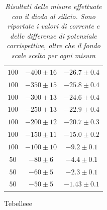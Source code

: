 \documentclass{article}
\begin{document}
\begin{table}[]
{\begin{tabular}{|c|c|c|}
$100$ & $-400\pm{16}$ & $-26.7\pm{0.4}$ \\
$100$ & $-350\pm{15}$ & $-25.8\pm{0.4}$ \\
$100$ & $-300\pm{13}$ & $-24.6\pm{0.4}$ \\
$100$ & $-250\pm{13}$ & $-22.9\pm{0.4}$ \\
$100$ & $-200\pm{12}$ & $-20.7\pm{0.3}$ \\
$100$ & $-150\pm{11}$ & $-15.0\pm{0.2}$ \\
$100$ & $-100\pm{10}$ & $-9.2\pm{0.1}$ \\
$50$ & $-80\pm{6}$ & $-4.4\pm{0.1}$ \\
$50$ & $-60\pm{5}$ & $-2.3\pm{0.1}$ \\
$50$ & $-50\pm{5}$ & $-1.43\pm{0.1}$ \\

\hline
\end{tabular}
 }
 \caption{\textit{Risultati delle misure effettuate con il diodo al silicio. Sono riportate i valori di corrente e delle differenze di potenziale corrispettive, oltre che il fondo scale scelto per ogni misura}}
\end{table}

Tebelleee
\end{document}
